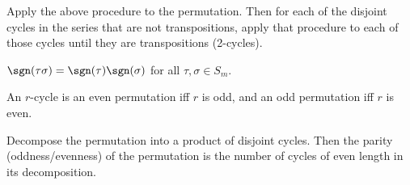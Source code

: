 \begin{procedure}
  Apply the above procedure to the permutation. Then for each of the disjoint cycles in the series that are not transpositions, apply that procedure to each of those cycles until they are transpositions (2-cycles).
\end{procedure}

\begin{lemma}
  $\sgn(\tau \sigma) = \sgn(\tau) \sgn(\sigma)$ for all $\tau, \sigma \in S_m$.
\end{lemma}

\begin{lemma}
  An $r$-cycle is an even permutation iff $r$ is odd, and an odd permutation iff $r$ is even.
\end{lemma}

\begin{procedure}
  Decompose the permutation into a product of disjoint cycles. Then the parity (oddness/evenness) of the permutation is the number of cycles of even length in its decomposition.
\end{procedure}


